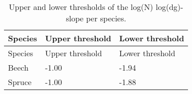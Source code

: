\begin{singlespace}
  {\tabulinesep=2mm
    \begin{longtabu}{l l L}
      \caption{Upper and lower thresholds of the log(N) log(dg)-slope per species. \label{tab:slope_thresholds}} \\
      \toprule
      Species & Upper threshold & Lower threshold \\
      \midrule
      \endfirsthead
      Species & Upper threshold & Lower threshold \\
      \midrule
      \endhead
      \bottomrule
      \endlastfoot
      Beech & -1.00 & -1.94 \\
      Spruce & -1.00 & -1.88 \\
    \end{longtabu}
  }
\end{singlespace}

